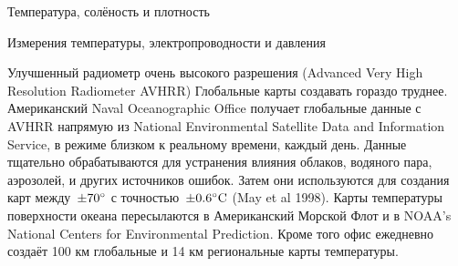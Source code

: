 \begin{chapter}{Температура, солёность и плотность}
\begin{section}{Измерения температуры, электропроводности и давления}
\begin{paragraph}{Улучшенный радиометр очень высокого разрешения (Advanced Very High Resolution Radiometer AVHRR)}
Глобальные карты создавать гораздо труднее. Американский Naval
Oceanographic Office получает глобальные данные с AVHRR напрямую из
National Environmental Satellite Data and Information Service, в
режиме близком к реальному времени, каждый день. Данные тщательно
обрабатываются для устранения влияния облаков, водяного пара,
аэрозолей, и других источников ошибок. Затем они используются для
создания карт между~$\pm{70}^\circ$ с точностью~$\pm{0.6}^\circ\mbox{C}$
(May et al 1998). Карты температуры поверхности океана пересылаются в
Американский Морской Флот и в NOAA's National Centers for
Environmental Prediction. Кроме того офис ежедневно создаёт 100 км
глобальные и 14 км региональные карты температуры.
%

\end{paragraph}


\end{section}
\end{chapter}
